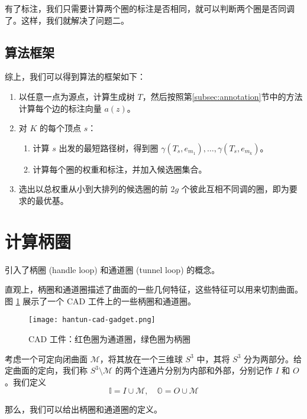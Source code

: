有了标注，我们只需要计算两个圈的标注是否相同，就可以判断两个圈是否同调了。这样，我们就解决了问题二。

\subsection{算法框架}

综上，我们可以得到算法的框架如下：

\begin{enumerate}
    \item 以任意一点为源点，计算生成树 $ T $，然后按照第\ref{subsec:annotation}节中的方法计算每个边的标注向量 $ a(z) $。
    \item 对 $ K $ 的每个顶点 $ s $：
    \begin{enumerate}
        \item 计算 $ s $ 出发的最短路径树，得到圈 $ \gamma(T_s, e_{m_1}), \dots, \gamma(T_s, e_{m_k}) $。
        \item 计算每个圈的权重和标注，并加入候选圈集合。
    \end{enumerate}
    \item 选出以总权重从小到大排列的候选圈的前 $ 2g $ 个彼此互相不同调的圈，即为要求的最优基。
\end{enumerate}

\section{计算柄圈}

\citet{oncomputinghantun} 引入了柄圈 (handle loop) 和通道圈 (tunnel loop) 的概念。

直观上，柄圈和通道圈描述了曲面的一些几何特征，这些特征可以用来切割曲面。图 \ref{fig:hantuncadgadget} 展示了一个 CAD 工件上的一些柄圈和通道圈。

\begin{figure}[h]
    \centering
    \texttt{[image: hantun-cad-gadget.png]}
    \caption{CAD 工件：红色圈为通道圈，绿色圈为柄圈}
    \label{fig:hantuncadgadget}
\end{figure}

考虑一个可定向闭曲面 $ \mathcal{M} $，将其放在一个三维球 $ S^3 $ 中，其将 $ S^3 $ 分为两部分。给定曲面的定向，我们称 $ S^3 \setminus \mathcal{M} $ 的两个连通片分别为内部和外部，分别记作 $ I $ 和 $ O $。我们定义
$$
\mathbb{I} = I \cup \mathcal{M}, \quad \mathbb{O} = O \cup \mathcal{M}
$$

那么，我们可以给出柄圈和通道圈的定义。

